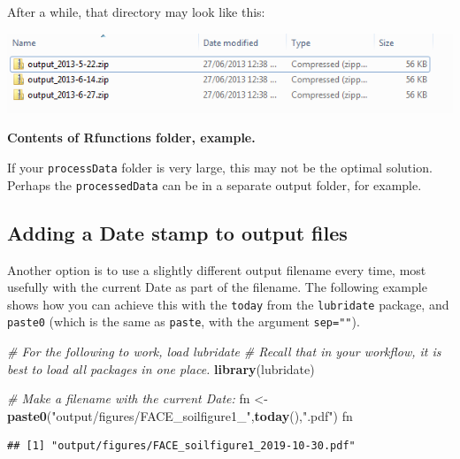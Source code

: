 \documentclass[]{book}
\newenvironment{Shaded}{\begin{snugshade}}{\end{snugshade}}
\newcommand{\CommentTok}[1]{\textcolor[rgb]{0.56,0.35,0.01}{\textit{#1}}}
\newcommand{\KeywordTok}[1]{\textcolor[rgb]{0.13,0.29,0.53}{\textbf{#1}}}
\newcommand{\NormalTok}[1]{#1}
\newcommand{\StringTok}[1]{\textcolor[rgb]{0.31,0.60,0.02}{#1}}
\begin{document}
After a while, that directory may look like this:

\includegraphics[width=0.7\linewidth]{screenshots/archive}

\textbf{Contents of Rfunctions folder, example.}

If your \texttt{processData} folder is very large, this may not be the optimal solution. Perhaps the \texttt{processedData} can be in a separate output folder, for example.

\hypertarget{adding-a-date-stamp-to-output-files}{%
\subsection{Adding a Date stamp to output files}\label{adding-a-date-stamp-to-output-files}}

Another option is to use a slightly different output filename every time, most usefully with the current Date as part of the filename. The following example shows how you can achieve this with the \texttt{today} from the \texttt{lubridate} package, and \texttt{paste0} (which is the same as \texttt{paste}, with the argument \texttt{sep=""}).

\begin{Shaded}
\begin{Highlighting}[]
\CommentTok{# For the following to work, load lubridate}
\CommentTok{# Recall that in your workflow, it is best to load all packages in one place.}
\KeywordTok{library}\NormalTok{(lubridate)}

\CommentTok{# Make a filename with the current Date:}
\NormalTok{fn <-}\StringTok{ }\KeywordTok{paste0}\NormalTok{(}\StringTok{"output/figures/FACE_soilfigure1_"}\NormalTok{,}\KeywordTok{today}\NormalTok{(),}\StringTok{".pdf"}\NormalTok{)}
\NormalTok{fn}
\end{Highlighting}
\end{Shaded}

\begin{verbatim}
## [1] "output/figures/FACE_soilfigure1_2019-10-30.pdf"
\end{verbatim}

\begin{Shaded}
\end{Shaded}
\end{document}
